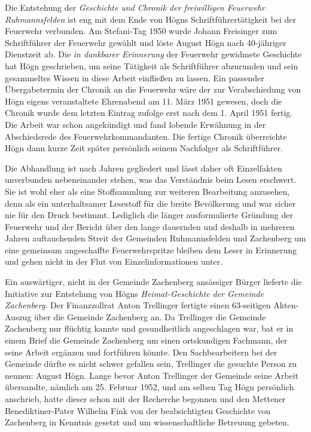 \documentclass{book}
\newcommand{\zitat}[1]{\textit{#1}}
\begin{document}
Die Entstehung der \textit{Geschichte und Chronik der freiwilligen
Feuerwehr Ruhmanns\-felden} ist eng mit dem Ende von Högns
Schriftführertätigkeit bei der Feu\-erwehr verbunden. Am Stefani-Tag
1950 wurde Johann Freisinger zum Schriftführer der Feuerwehr gewählt
und löste August Högn nach 40-jähriger Dienstzeit ab. Die
\zitat{in dankbarer Erinnerung} der Feuerwehr gewidmete
Ge\-schichte hat Högn geschrieben, um seine Tätigkeit als Schriftführer
abzu\-run\-den und sein gesammeltes Wissen in diese Arbeit einfließen
zu lassen. Ein passender Übergabetermin der Chronik an die Feuerwehr
wäre der zur Verab\-schiedung von Högn eigens veranstaltete Ehrenabend
am 11. März 1951 ge\-wesen, doch die Chronik wurde dem letzten Eintrag
zufolge erst nach dem 1. April 1951 fertig. Die Arbeit war schon
angekündigt und fand lobende Er\-wähnung in der Abschiedsrede des
Feuerwehrkommandanten. Die fertige Chronik überreichte Högn dann kurze
Zeit später persönlich seinem Nach\-folger als Schriftführer.

Die Abhandlung ist nach Jahren gegliedert und lässt daher oft
Einzelfakten unverbunden nebeneinander stehen, was das Verständnis beim
Lesen er\-schwert. Sie ist wohl eher als eine Stoffsammlung zur
weiteren Bearbeitung anzusehen, denn als ein unterhaltsamer Lesestoff
für die breite Bevölkerung und war sicher nie für den Druck bestimmt.
Lediglich die länger ausfor\-mulierte Gründung der Feuerwehr und der
Bericht über den lange dauernden und deshalb in mehreren Jahren
auftauchenden Streit der Gemeinden Ruh\-mannsfelden und Zachenberg um
eine gemeinsam angeschaffte Feuerwehr\-spritze bleiben dem Leser in
Erinnerung und gehen nicht in der Flut von Einzelinformationen unter.

Ein auswärtiger, nicht in der Gemeinde Zachenberg ansässiger Bürger
lieferte die Initiative zur Entstehung von Högns
\textit{Heimat-Geschichte der Gemeinde Zachenberg}. Der Finanzzollrat
Anton Trellinger fertigte einen 63-seitigen Ak\-ten-Auszug über die
Gemeinde Zachenberg an. Da Trellinger die Gemeinde Zachenberg nur
flüchtig kannte und gesundheitlich angeschlagen war, bat er in einem
Brief die Gemeinde Zachenberg um einen ortskundigen Fachmann, der seine
Arbeit ergänzen und fortführen könnte. Den Sachbearbeitern bei der
Gemeinde dürfte es nicht schwer gefallen sein, Trellinger die gesuchte
Person zu nennen: August Högn. Lange bevor Anton Trellinger der
Gemeinde seine Arbeit übersandte, nämlich am 25. Februar 1952, und am
selben Tag Högn persönlich anschrieb, hatte dieser schon mit der
Recherche begonnen und den Mettener Benediktiner-Pater Wilhelm Fink von
der beabsichtigten Geschichte von Zachenberg in Kenntnis gesetzt und um
wissenschaftliche Betreuung gebeten.
\end{document}
